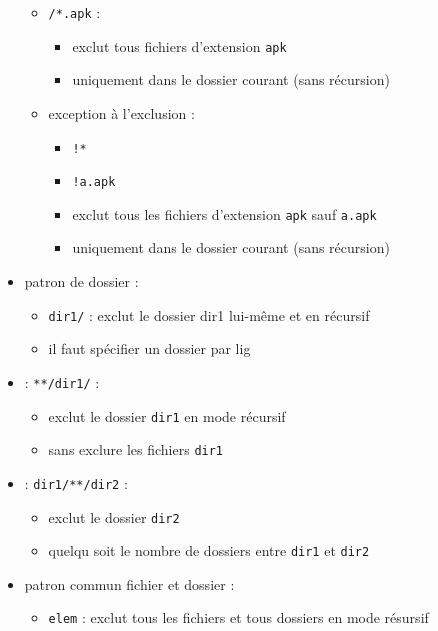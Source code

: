 \documentclass[11pt,twoside,headings=normal,open=right,french,DIV=12]{scrreprt}
\newcommand{\spec}[1]{\texttt{#1}}
\begin{document}
\begin{itemize}
\begin{itemize}
\begin{itemize}
			\end{itemize}		
			\item \spec{/*.apk} : 
			\begin{itemize}
				\item exclut tous fichiers d'extension \spec{apk}
				\item uniquement dans le dossier courant (sans récursion)
			\end{itemize}					
			\item exception à l'exclusion : 
			\begin{itemize}
				\item\spec{!*}
				\item \spec{!a.apk}
				\item exclut tous les fichiers d'extension \spec{apk} sauf \spec{a.apk}
				\item uniquement dans le dossier courant (sans récursion)
			\end{itemize}				
		\end{itemize}			        
        \item patron de dossier :
		\begin{itemize}        
			\item \spec{dir1/} : exclut le dossier {dir1} lui-même et en récursif
			\item il faut spécifier un dossier par lig
		\end{itemize}		
        \item : \spec{**/dir1/} :
		\begin{itemize}        
			\item exclut le dossier \spec{dir1} en mode récursif
			\item sans exclure les fichiers \spec{dir1}
		\end{itemize}		
        \item : \spec{dir1/**/dir2} :
		\begin{itemize}        
			\item exclut le dossier \spec{dir2}
			\item quelqu soit le nombre de dossiers entre \spec{dir1} et \spec{dir2}
		\end{itemize}		
        \item patron commun fichier et dossier :
		\begin{itemize}        
			\item \spec{elem} : exclut tous les fichiers et tous dossiers en mode résursif			
		\end{itemize}							
    \end{itemize}
\end{document}
